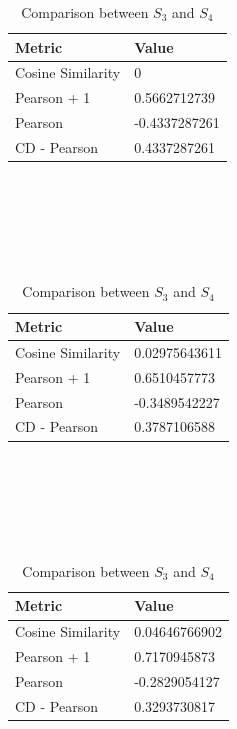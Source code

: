 \begin{table}[!htb]
    \begin{subtable}{.5\linewidth}
        \centering
        
            \begin{tabular}{ll}
            \hline
            Metric            & Value         \\
            \hline
            Cosine Similarity & 0             \\
            Pearson + 1       & 0.5662712739  \\
            Pearson           & -0.4337287261 \\
            CD - Pearson      & 0.4337287261  \\
            \hline
            \end{tabular}\\
            \\
            \caption{Comparison between $S_1$ and $S_2$}\\
            \\
            
            \begin{tabular}{ll}
            \hline
            Metric            & Value         \\
            \hline
            Cosine Similarity & 0.02975643611 \\
            Pearson + 1       & 0.6510457773  \\
            Pearson           & -0.3489542227 \\
            CD - Pearson      & 0.3787106588  \\
            \hline
            \end{tabular}\\
            \\
            \caption{Comparison between $S_2$ and $S_3$}\\
            \\
            
            \begin{tabular}{ll}
            \hline
            Metric            & Value         \\
            \hline
            Cosine Similarity & 0.04646766902 \\
            Pearson + 1       & 0.7170945873  \\
            Pearson           & -0.2829054127 \\
            CD - Pearson      & 0.3293730817  \\
            \hline
            \end{tabular}\\
            \\
            \caption{Comparison between $S_3$ and $S_4$}\\
            \\
            

\end{subtable}
\end{table}
